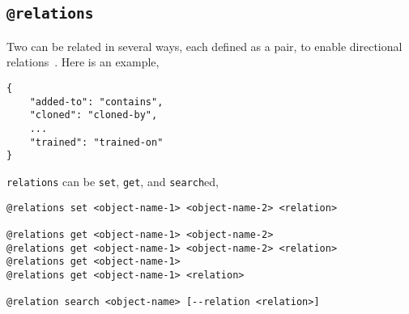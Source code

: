 \subsection{\texttt{@relations}}\label{relations}

Two  can be related in several ways, each defined as a pair, to enable directional relations~. Here is an example,
%
\begin{verbatim}
{
    "added-to": "contains",
    "cloned": "cloned-by",
    ...
    "trained": "trained-on"
}
\end{verbatim}
%
\texttt{relations} can be \texttt{set}, \texttt{get}, and \texttt{search}ed, 
%
\begin{verbatim}
@relations set <object-name-1> <object-name-2> <relation>

@relations get <object-name-1> <object-name-2>
@relations get <object-name-1> <object-name-2> <relation>
@relations get <object-name-1>
@relations get <object-name-1> <relation>

@relation search <object-name> [--relation <relation>]
\end{verbatim}
